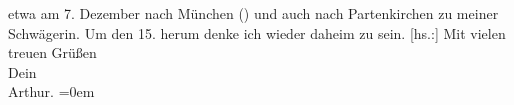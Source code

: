\begin{ledgroupsized}[t]{13cm}
               etwa am 7. Dezember nach München (\label{K_L01981-5v}\label{K_L01981-5h}) und auch nach Partenkirchen zu meiner
                  Schwägerin. Um den 15. herum denke ich wieder daheim zu sein.\pend
           \pstart
           {[}hs.:{]} Mit vielen treuen Grüßen{\\[\baselineskip]}Dein{\\[\baselineskip]}\spacefill\mbox{Arthur.}\pend
           \leftskip=0em{}
         
         \endnumbering{}\end{ledgroupsized}  \newcommand{\dateiname}{L01981}\newcommand{\titel}{Arthur Schnitzler an Hermann Bahr, 17. 11. 1910}\newcommand{\editorInnen}{ Kurt Ifkovits,  Martin Anton Müller}
      